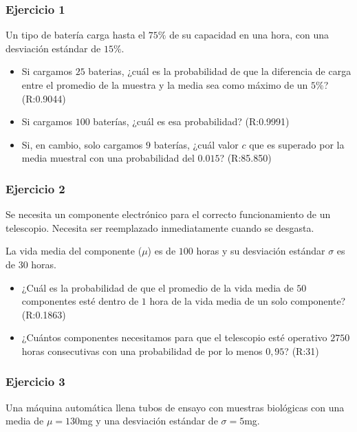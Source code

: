 \documentclass[
]{book}
\begin{document}
\hypertarget{ejercicio-1-5}{%
\subsubsection{Ejercicio 1}\label{ejercicio-1-5}}

Un tipo de batería carga hasta el \(75\%\) de su capacidad en una hora, con una desviación estándar de \(15\%\).

\begin{itemize}
\item
  Si cargamos \(25\) baterias, ¿cuál es la probabilidad de que la diferencia de carga entre el promedio de la muestra y la media sea como máximo de un \(5\%\)? (R:0.9044)
\item
  Si cargamos \(100\) baterías, ¿cuál es esa probabilidad? (R:0.9991)
\item
  Si, en cambio, solo cargamos \(9\) baterías, ¿cuál valor \(c\) que es superado por la media muestral con una probabilidad del \(0.015\)? (R:85.850)
\end{itemize}

\hypertarget{ejercicio-2-5}{%
\subsubsection{Ejercicio 2}\label{ejercicio-2-5}}

Se necesita un componente electrónico para el correcto funcionamiento de un telescopio. Necesita ser reemplazado inmediatamente cuando se desgasta.

La vida media del componente (\(\mu\)) es de \(100\) horas y su desviación estándar \(\sigma\) es de \(30\) horas.

\begin{itemize}
\item
  ¿Cuál es la probabilidad de que el promedio de la vida media de \(50\) componentes esté dentro de \(1\) hora de la vida media de un solo componente? (R:0.1863)
\item
  ¿Cuántos componentes necesitamos para que el telescopio esté operativo \(2750\) horas consecutivas con una probabilidad de por lo menos \(0,95\)? (R:31)
\end{itemize}

\hypertarget{ejercicio-3-3}{%
\subsubsection{Ejercicio 3}\label{ejercicio-3-3}}

Una máquina automática llena tubos de ensayo con muestras biológicas con una media de \(\mu=130\)mg y una desviación estándar de \(\sigma=5\)mg.
\end{document}
